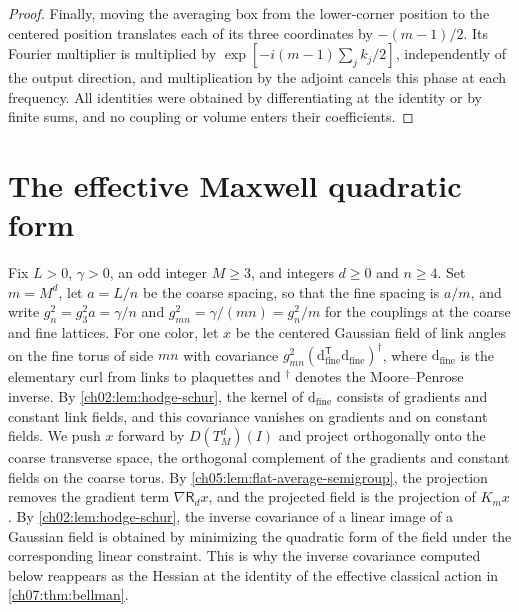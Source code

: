 \begin{proof}
Finally, moving the averaging box from the lower-corner position to the centered position translates each of its three coordinates by $-(m-1)/2$. Its Fourier multiplier is multiplied by $\exp[-i(m-1)\sum_jk_j/2]$, independently of the output direction, and multiplication by the adjoint cancels this phase at each frequency. All identities were obtained by differentiating at the identity or by finite sums, and no coupling or volume enters their coefficients.
\end{proof}

\section{The effective Maxwell quadratic form}\label{ch05:sec:maxwell}

Fix $L>0$, $\gamma>0$, an odd integer $M\ge3$, and integers $d\ge0$ and $n\ge4$. Set $m=M^d$, let $a=L/n$ be the coarse spacing, so that the fine spacing is $a/m$, and write $g_n^2=g_3^2a=\gamma/n$ and $g_{mn}^2=\gamma/(mn)=g_n^2/m$ for the couplings at the coarse and fine lattices. For one color, let $x$ be the centered Gaussian field of link angles on the fine torus of side $mn$ with covariance $g_{mn}^2(\mathrm d_{\mathrm{fine}}^{\mathsf T}\mathrm d_{\mathrm{fine}})^\dagger$, where $\mathrm d_{\mathrm{fine}}$ is the elementary curl from links to plaquettes and $^\dagger$ denotes the Moore--Penrose inverse. By \cref{ch02:lem:hodge-schur}, the kernel of $\mathrm d_{\mathrm{fine}}$ consists of gradients and constant link fields, and this covariance vanishes on gradients and on constant fields. We push $x$ forward by $D(T_M^d)(I)$ and project orthogonally onto the coarse transverse space, the orthogonal complement of the gradients and constant fields on the coarse torus. By \cref{ch05:lem:flat-average-semigroup}, the projection removes the gradient term $\nabla\mathsf R_dx$, and the projected field is the projection of $K_mx$. By \cref{ch02:lem:hodge-schur}, the inverse covariance of a linear image of a Gaussian field is obtained by minimizing the quadratic form of the field under the corresponding linear constraint. This is why the inverse covariance computed below reappears as the Hessian at the identity of the effective classical action in \cref{ch07:thm:bellman}.

